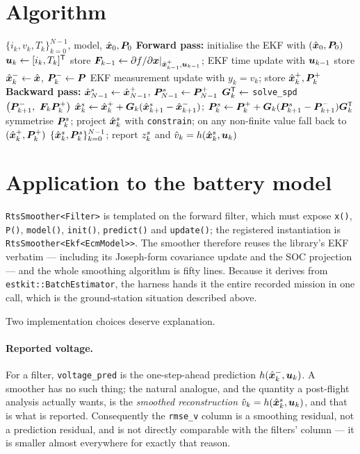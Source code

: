 \section{Algorithm}
\begin{algorithm}[H]
\caption{Extended RTS smoother --- whole record}
\begin{algorithmic}[1]
\Require $\{i_k,v_k,T_k\}_{k=0}^{N-1}$, model, $\hat{\bm{x}}_0,\bm{P}_0$
\State \textbf{Forward pass:} initialise the EKF with $(\hat{\bm{x}}_0,\bm{P}_0)$
   \State $\bm{u}_k\gets[i_k,T_k]^{\mathsf{T}}$
    store $\bm{F}_{k-1}\gets\partial f/\partial\bm{x}|_{\hat{\bm{x}}^{+}_{k-1},\bm{u}_{k-1}}$; EKF time update with $\bm{u}_{k-1}$ \EndIf
   \State store $\hat{\bm{x}}^{-}_k\gets\hat{\bm{x}}$, $\bm{P}^-_k\gets\bm{P}$
   \State EKF measurement update with $y_k=v_k$; store $\hat{\bm{x}}^{+}_k,\bm{P}^+_k$
\EndFor
\State \textbf{Backward pass:} $\hat{\bm{x}}^s_{N-1}\gets\hat{\bm{x}}^{+}_{N-1}$, $\bm{P}^s_{N-1}\gets\bm{P}^+_{N-1}$
   \State $\bm{G}_k^{\mathsf{T}}\gets$ \texttt{solve\_spd}$\left(\bm{P}^-_{k+1},\ \bm{F}_k\bm{P}^+_k\right)$ 
   \State $\hat{\bm{x}}^s_k\gets\hat{\bm{x}}^{+}_k+\bm{G}_k(\hat{\bm{x}}^s_{k+1}-\hat{\bm{x}}^{-}_{k+1})$; \quad $\bm{P}^s_k\gets\bm{P}^+_k+\bm{G}_k(\bm{P}^s_{k+1}-\bm{P}^-_{k+1})\bm{G}_k^{\mathsf{T}}$
   \State symmetrise $\bm{P}^s_k$; project $\hat{\bm{x}}^s_k$ with \texttt{constrain}; on any non-finite value fall back to $(\hat{\bm{x}}^{+}_k,\bm{P}^+_k)$
\EndFor
\Ensure $\{\hat{\bm{x}}^s_k,\bm{P}^s_k\}_{k=0}^{N-1}$; report $z^s_k$ and $\hat v_k=h(\hat{\bm{x}}^s_k,\bm{u}_k)$
\end{algorithmic}
\end{algorithm}

\section{Application to the battery model}
\texttt{RtsSmoother<Filter>} is templated on the forward filter, which must expose
\texttt{x()}, \texttt{P()}, \texttt{model()}, \texttt{init()}, \texttt{predict()} and
\texttt{update()}; the registered instantiation is \texttt{RtsSmoother<Ekf<EcmModel>{}>}.  The
smoother therefore reuses the library's EKF verbatim --- including its Joseph-form covariance update
and the SOC projection --- and the whole smoothing algorithm is fifty lines.  Because it derives
from \texttt{estkit::BatchEstimator}, the harness hands it the entire recorded mission in one call,
which is the ground-station situation described above.

Two implementation choices deserve explanation.

\paragraph{Reported voltage.}  For a filter, \texttt{voltage\_pred} is the one-step-ahead prediction
$h(\hat{\bm{x}}^{-}_k,\bm{u}_k)$.  A smoother has no such thing; the natural analogue, and the quantity a
post-flight analysis actually wants, is the \emph{smoothed reconstruction}
$\hat v_k=h(\hat{\bm{x}}^s_k,\bm{u}_k)$, and that is what is reported.  Consequently the
\texttt{rmse\_v} column is a smoothing residual, not a prediction residual, and is not directly
comparable with the filters' column --- it is smaller almost everywhere for exactly that reason.

